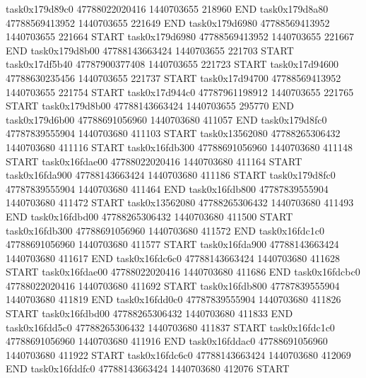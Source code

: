 task0x179d89c0 47788022020416          1440703655               218960  END
task0x179d8a80 47788569413952          1440703655               221649  END
task0x179d6980 47788569413952          1440703655               221664  START
task0x179d6980 47788569413952          1440703655               221667  END
task0x179d8b00 47788143663424          1440703655               221703  START
task0x17df5b40 47787900377408          1440703655               221723  START
task0x17d94600 47788630235456          1440703655               221737  START
task0x17d94700 47788569413952          1440703655               221754  START
task0x17d944c0 47787961198912          1440703655               221765  START
task0x179d8b00 47788143663424          1440703655               295770  END
task0x179d6b00 47788691056960          1440703680               411057  END
task0x179d8fc0 47787839555904          1440703680               411103  START
task0x13562080 47788265306432          1440703680               411116  START
task0x16fdb300 47788691056960          1440703680               411148  START
task0x16fdae00 47788022020416          1440703680               411164  START
task0x16fda900 47788143663424          1440703680               411186  START
task0x179d8fc0 47787839555904          1440703680               411464  END
task0x16fdb800 47787839555904          1440703680               411472  START
task0x13562080 47788265306432          1440703680               411493  END
task0x16fdbd00 47788265306432          1440703680               411500  START
task0x16fdb300 47788691056960          1440703680               411572  END
task0x16fdc1c0 47788691056960          1440703680               411577  START
task0x16fda900 47788143663424          1440703680               411617  END
task0x16fdc6c0 47788143663424          1440703680               411628  START
task0x16fdae00 47788022020416          1440703680               411686  END
task0x16fdcbc0 47788022020416          1440703680               411692  START
task0x16fdb800 47787839555904          1440703680               411819  END
task0x16fdd0c0 47787839555904          1440703680               411826  START
task0x16fdbd00 47788265306432          1440703680               411833  END
task0x16fdd5c0 47788265306432          1440703680               411837  START
task0x16fdc1c0 47788691056960          1440703680               411916  END
task0x16fddac0 47788691056960          1440703680               411922  START
task0x16fdc6c0 47788143663424          1440703680               412069  END
task0x16fddfc0 47788143663424          1440703680               412076  START
